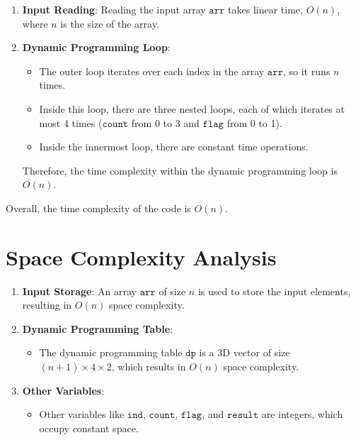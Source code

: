 \documentclass{article}
\begin{document}
\begin{enumerate}
    \item \textbf{Input Reading}: Reading the input array $\texttt{arr}$ takes linear time, $O(n)$, where $n$ is the size of the array.
    
    \item \textbf{Dynamic Programming Loop}:
    \begin{itemize}
        \item The outer loop iterates over each index in the array $\texttt{arr}$, so it runs $n$ times.
        \item Inside this loop, there are three nested loops, each of which iterates at most 4 times ($\texttt{count}$ from 0 to 3 and $\texttt{flag}$ from 0 to 1).
        \item Inside the innermost loop, there are constant time operations.
    \end{itemize}
    Therefore, the time complexity within the dynamic programming loop is $O(n)$.
\end{enumerate}

Overall, the time complexity of the code is $O(n)$.


\section*{Space Complexity Analysis}

\begin{enumerate}
    \item \textbf{Input Storage}: An array $\texttt{arr}$ of size $n$ is used to store the input elements, resulting in $O(n)$ space complexity.
    
    \item \textbf{Dynamic Programming Table}:
    \begin{itemize}
        \item The dynamic programming table $\texttt{dp}$ is a 3D vector of size $(n+1) \times 4 \times 2$, which results in $O(n)$ space complexity.
    \end{itemize}
    
    \item \textbf{Other Variables}:
    \begin{itemize}
        \item Other variables like $\texttt{ind}$, $\texttt{count}$, $\texttt{flag}$, and $\texttt{result}$ are integers, which occupy constant space.
    \end{itemize}
\end{enumerate}
\end{document}
